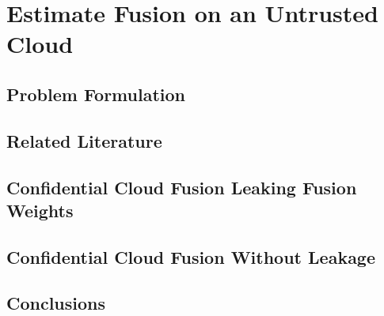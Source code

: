 
\chapter{Estimate Fusion on an Untrusted Cloud}
\section{Problem Formulation}
\section{Related Literature}
\section{Confidential Cloud Fusion Leaking Fusion Weights}
\section{Confidential Cloud Fusion Without Leakage}
\section{Conclusions}